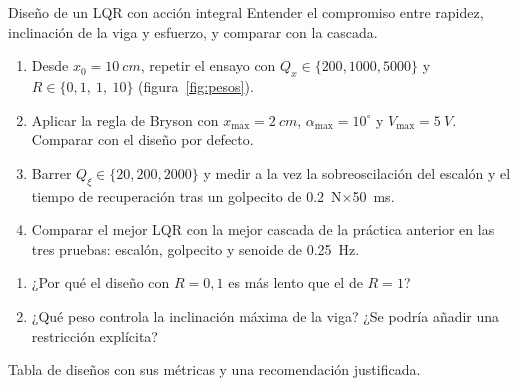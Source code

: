 \label{pr:lqr}
\begin{practica}{Diseño de un LQR con acción integral}
\objetivos Entender el compromiso entre rapidez, inclinación de la viga y esfuerzo, y comparar con la cascada.
\procedimiento
\begin{enumerate}
  \item Desde $x_0=\SI{10}{cm}$, repetir el ensayo con $Q_x\in\{200,1000,5000\}$ y $R\in\{0{,}1,\ 1,\ 10\}$ (figura~\ref{fig:pesos}).
  \item Aplicar la regla de Bryson con $x_{\max}=\SI{2}{cm}$, $\alpha_{\max}=10^\circ$ y $V_{\max}=\SI{5}{V}$. Comparar con el diseño por defecto.
  \item Barrer $Q_\xi\in\{20,200,2000\}$ y medir a la vez la sobreoscilación del escalón y el tiempo de recuperación tras un golpecito de \SI{0.2}{N}$\times$\SI{50}{ms}.
  \item Comparar el mejor LQR con la mejor cascada de la práctica anterior en las tres pruebas: escalón, golpecito y senoide de \SI{0.25}{Hz}.
\end{enumerate}
\preguntas
\begin{enumerate}
  \item ¿Por qué el diseño con $R=0{,}1$ es más lento que el de $R=1$?
  \item ¿Qué peso controla la inclinación máxima de la viga? ¿Se podría añadir una restricción explícita?
\end{enumerate}
\entregables Tabla de diseños con sus métricas y una recomendación justificada.
\end{practica}

